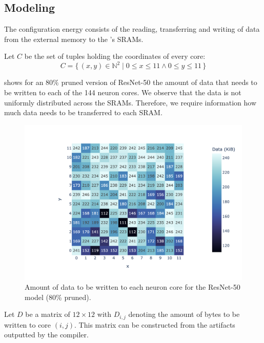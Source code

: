 \subsection{Modeling}
The configuration energy consists of the reading, transferring and writing of data from the external memory to the \graicore{}'s SRAMs. 

Let $C$ be the set of tuples holding the coordinates of every core:
\begin{equation*}
    C = \{\,\left(x,y\right) \in \mathbb{N}^2 \mid 0 \leq x \leq 11 \wedge 0 \leq y \leq 11 \,\} 
\end{equation*}

 shows for an $80\%$ pruned version of ResNet-50 the amount of data that needs to be written to each of the 144 neuron cores.
We observe that the data is not uniformly distributed across the SRAMs.
Therefore, we require information how much data needs to be transferred to each SRAM.

\begin{figure}[hbtp]
    \centering
    \includegraphics[clip, trim=80 20 10 30, width=0.8\linewidth]{assets/resnet50_coredata_heatmap.png}
    \caption{Amount of data to be written to each neuron core for the ResNet-50 model (80\% pruned).}
    \label{fig:model_data_heapmap}
\end{figure}

Let $D$ be a matrix of $12 \times 12$ with $D_{i,j}$ denoting the amount of bytes to be written to core $\left( i,j \right)$.
This matrix can be constructed from the artifacts outputted by the compiler.


